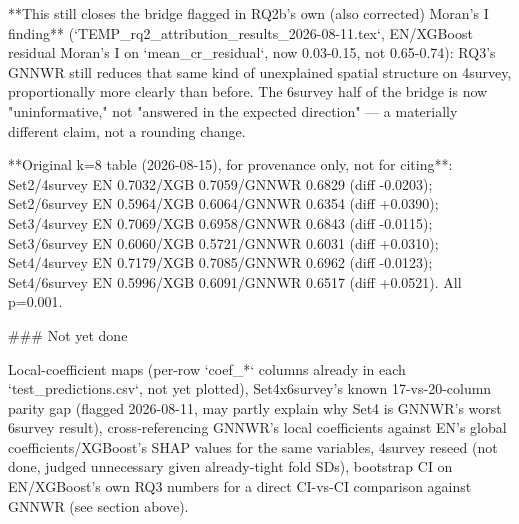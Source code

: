 **This still closes the bridge flagged in RQ2b's own (also corrected) Moran's I finding**
(`TEMP_rq2_attribution_results_2026-08-11.tex`, EN/XGBoost residual Moran's I on `mean_cr_residual`,
now 0.03-0.15, not 0.65-0.74): RQ3's GNNWR still reduces that same kind of unexplained spatial
structure on 4survey, proportionally more clearly than before. The 6survey half of the bridge is
now "uninformative," not "answered in the expected direction" — a materially different claim, not
a rounding change.

**Original k=8 table (2026-08-15), for provenance only, not for citing**: Set2/4survey EN
0.7032/XGB 0.7059/GNNWR 0.6829 (diff -0.0203); Set2/6survey EN 0.5964/XGB 0.6064/GNNWR 0.6354 (diff
+0.0390); Set3/4survey EN 0.7069/XGB 0.6958/GNNWR 0.6843 (diff -0.0115); Set3/6survey EN 0.6060/XGB
0.5721/GNNWR 0.6031 (diff +0.0310); Set4/4survey EN 0.7179/XGB 0.7085/GNNWR 0.6962 (diff -0.0123);
Set4/6survey EN 0.5996/XGB 0.6091/GNNWR 0.6517 (diff +0.0521). All p=0.001.

### Not yet done

Local-coefficient maps (per-row `coef_*` columns already in each `test_predictions.csv`, not yet
plotted), Set4x6survey's known 17-vs-20-column parity gap (flagged 2026-08-11, may partly explain
why Set4 is GNNWR's worst 6survey result), cross-referencing GNNWR's local coefficients against
EN's global coefficients/XGBoost's SHAP values for the same variables, 4survey reseed (not done,
judged unnecessary given already-tight fold SDs), bootstrap CI on EN/XGBoost's own RQ3 numbers for
a direct CI-vs-CI comparison against GNNWR (see section above).

